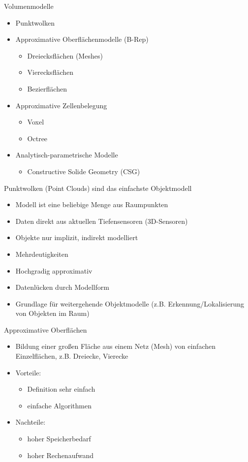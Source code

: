 \documentclass[paper=a4, fontsize=11pt]{scrartcl} %
\numberwithin{equation}{section} %
\numberwithin{figure}{section} %
\numberwithin{table}{section} %
\begin{document}
Volumenmodelle
\begin{itemize}
\item Punktwolken
\item Approximative Oberflächenmodelle (B-Rep)
\begin{itemize}
\item Dreiecksflächen (Meshes)
\item Vierecksflächen
\item Bezierflächen
\end{itemize}
\item Approximative Zellenbelegung
\begin{itemize}
\item Voxel
\item Octree
\end{itemize}
\item Analytisch-parametrische Modelle
\begin{itemize}
\item Constructive Solide Geometry (CSG)
\end{itemize}
\end{itemize}

Punktwolken (Point Clouds) sind das einfachste Objektmodell
\begin{itemize}
\item Modell ist eine beliebige Menge aus Raumpunkten
\item Daten direkt aus aktuellen Tiefensensoren (3D-Sensoren)
\item Objekte nur implizit, indirekt modelliert
\item Mehrdeutigkeiten
\item Hochgradig approximativ
\item Datenlücken durch Modellform
\item Grundlage für weitergehende Objektmodelle (z.B. Erkennung/Lokalisierung von Objekten im Raum)
\end{itemize}

Approximative Oberflächen
\begin{itemize}
\item Bildung einer großen Fläche aus einem Netz (Mesh) von einfachen Einzelflächen, z.B. Dreiecke, Vierecke
\item Vorteile:
\begin{itemize}
\item Definition sehr einfach
\item einfache Algorithmen
\end{itemize}
\item Nachteile:
\begin{itemize}
\item hoher Speicherbedarf
\item hoher Rechenaufwand
\end{itemize}
\end{itemize}
\end{document}
